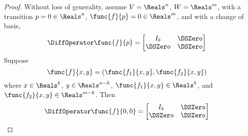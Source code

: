 \begin{proof}
    Without loss of generality, assume \(V = \Reals^n\), \(W = \Reals^m\), with a transition \(p = 0 \in \Reals^n\), \(\func{f}{p} = 0 \in \Reals^m\), and with a change of basis,
    \begin{equation*}
        \DiffOperator \func{f}{p} = \begin{bmatrix}
            I_k     & \DSZero \\
            \DSZero & \DSZero \\
        \end{bmatrix}
    \end{equation*}
    Suppose
    \begin{equation*}
        \func{f}{x,y} = (\func{f_1}{x,y}, \func{f_2}{x,y})
    \end{equation*}
    where \(x \in \Reals^k\), \(y \in \Reals^{n-k}\), \(\func{f_1}{x,y} \in \Reals^k\), and \(\func{f_2}{x,y} \in \Reals^{m-k}\). Then
    \begin{equation*}
        \DiffOperator \func{f}{0,0} = \begin{bmatrix}
            I_k     & \DSZero \\
            \DSZero & \DSZero
        \end{bmatrix}
    \end{equation*}


\end{proof}

